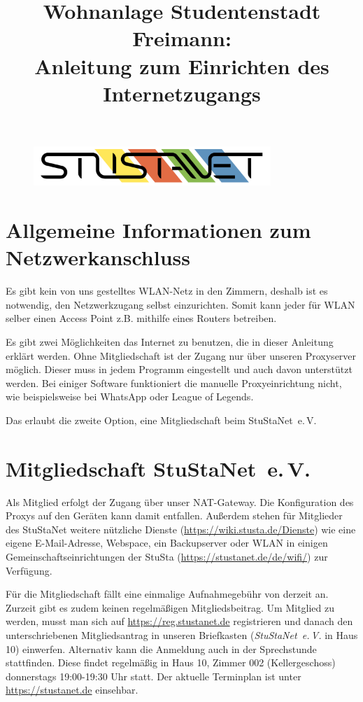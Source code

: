\documentclass[a4paper,12pt]{scrartcl}
\title{Wohnanlage Studentenstadt Freimann:\\
       Anleitung zum Einrichten des Internetzugangs}
\begin{document}
\maketitle

\begin{figure}[t!]
   \centering
   \vspace{-20pt}
   \includegraphics[width=0.8\textwidth,keepaspectratio]{Bilder/StuStaNet_Logo}
   \vspace{-40pt}
\end{figure}

\tableofcontents
\newpage

\section{Allgemeine Informationen zum Netzwerkanschluss}
Es gibt kein von uns gestelltes WLAN-Netz in den Zimmern, deshalb ist es notwendig, den Netzwerkzugang selbst einzurichten.
Somit kann jeder für WLAN selber einen Access Point z.B. mithilfe eines Routers betreiben.

Es gibt zwei Möglichkeiten das Internet zu benutzen, die in dieser Anleitung erklärt werden.
Ohne Mitgliedschaft ist der Zugang nur über unseren Proxyserver möglich.
Dieser muss in jedem Programm eingestellt und auch davon unterstützt werden.
Bei einiger Software funktioniert die manuelle Proxyeinrichtung nicht, wie beispielsweise bei WhatsApp oder League of Legends.

Das erlaubt die zweite Option, eine Mitgliedschaft beim StuStaNet~e.\,V.\@

\section{Mitgliedschaft StuStaNet~e.\,V.\@}
Als Mitglied erfolgt der Zugang über unser NAT-Gateway.
Die Konfiguration des Proxys auf den Geräten kann damit entfallen.
Außerdem stehen für Mitglieder des StuStaNet weitere nützliche Dienste (\url{https://wiki.stusta.de/Dienste}) wie eine eigene E-Mail-Adresse, Webspace, ein Backupserver oder WLAN in einigen Gemeinschaftseinrichtungen der StuSta (\url{https://stustanet.de/de/wifi/}) zur Verfügung. 

Für die Mitgliedschaft fällt eine einmalige Aufnahmegebühr von derzeit  an.
Zurzeit gibt es zudem keinen regelmäßigen Mitgliedsbeitrag.
Um Mitglied zu werden, musst man sich auf \mbox{\url{https://reg.stustanet.de}} registrieren und danach den unterschriebenen Mitgliedsantrag in unseren Briefkasten (\textit{StuStaNet~e.\,V.\@} in Haus 10) einwerfen.
Alternativ kann die Anmeldung auch in der Sprechstunde stattfinden.
Diese findet regelmäßig in Haus 10, Zimmer 002 (Kellergeschoss) donnerstags 19:00-19:30 Uhr statt.
Der aktuelle Terminplan ist unter \mbox{\url{https://stustanet.de}} einsehbar.
\end{document}
